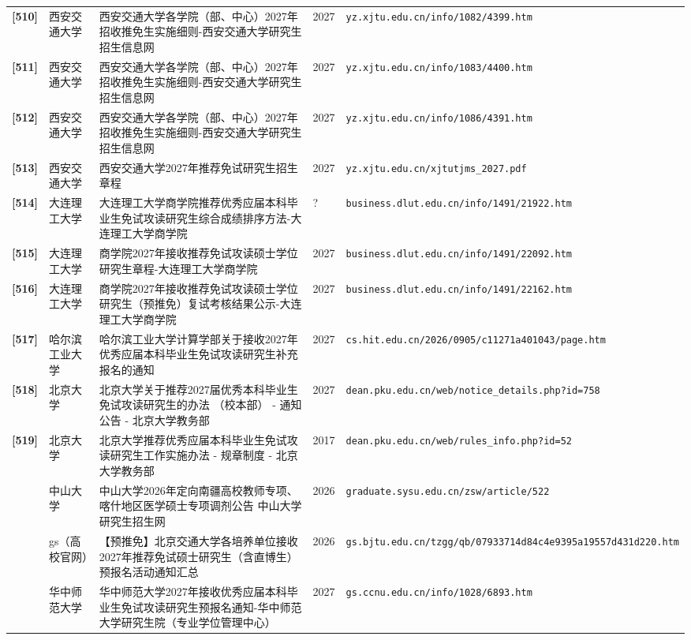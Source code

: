 {\begin{longtable}{@{}p{1.15cm}p{2.9cm}p{6.3cm}p{0.85cm}p{5.0cm}@{}}
\textbf{[510]} & 西安交通大学 & 西安交通大学各学院（部、中心）2027年招收推免生实施细则-西安交通大学研究生招生信息网 & 2027 & \texttt{yz.xjtu.edu.cn/info/1082/4399.htm} \\
\textbf{[511]} & 西安交通大学 & 西安交通大学各学院（部、中心）2027年招收推免生实施细则-西安交通大学研究生招生信息网 & 2027 & \texttt{yz.xjtu.edu.cn/info/1083/4400.htm} \\
\textbf{[512]} & 西安交通大学 & 西安交通大学各学院（部、中心）2027年招收推免生实施细则-西安交通大学研究生招生信息网 & 2027 & \texttt{yz.xjtu.edu.cn/info/1086/4391.htm} \\
\textbf{[513]} & 西安交通大学 & 西安交通大学2027年推荐免试研究生招生章程 & 2027 & \texttt{yz.xjtu.edu.cn/xjtutjms\_2027.pdf} \\
\textbf{[514]} & 大连理工大学 & 大连理工大学商学院推荐优秀应届本科毕业生免试攻读研究生综合成绩排序方法-大连理工大学商学院 & ? & \texttt{business.dlut.edu.cn/info/1491/21922.htm} \\
\textbf{[515]} & 大连理工大学 & 商学院2027年接收推荐免试攻读硕士学位研究生章程-大连理工大学商学院 & 2027 & \texttt{business.dlut.edu.cn/info/1491/22092.htm} \\
\textbf{[516]} & 大连理工大学 & 商学院2027年接收推荐免试攻读硕士学位研究生（预推免）复试考核结果公示-大连理工大学商学院 & 2027 & \texttt{business.dlut.edu.cn/info/1491/22162.htm} \\
\textbf{[517]} & 哈尔滨工业大学 & 哈尔滨工业大学计算学部关于接收2027年优秀应届本科毕业生免试攻读研究生补充报名的通知 & 2027 & \texttt{cs.hit.edu.cn/2026/0905/c11271a401043/page.htm} \\
\textbf{[518]} & 北京大学 & 北京大学关于推荐2027届优秀本科毕业生免试攻读研究生的办法 （校本部） - 通知公告 - 北京大学教务部 & 2027 & \texttt{dean.pku.edu.cn/web/notice\_details.php?id=758} \\
\textbf{[519]} & 北京大学 & 北京大学推荐优秀应届本科毕业生免试攻读研究生工作实施办法 - 规章制度 - 北京大学教务部 & 2017 & \texttt{dean.pku.edu.cn/web/rules\_info.php?id=52} \\
[0] & 中山大学 & 中山大学2026年定向南疆高校教师专项、喀什地区医学硕士专项调剂公告 \textbar{} 中山大学研究生招生网 & 2026 & \texttt{graduate.sysu.edu.cn/zsw/article/522} \\
[0] & gs（高校官网） & 【预推免】北京交通大学各培养单位接收2027年推荐免试硕士研究生（含直博生）预报名活动通知汇总 & 2026 & \texttt{gs.bjtu.edu.cn/tzgg/qb/07933714d84c4e9395a19557d431d220.htm} \\
[0] & 华中师范大学 & 华中师范大学2027年接收优秀应届本科毕业生免试攻读研究生预报名通知-华中师范大学研究生院（专业学位管理中心） & 2027 & \texttt{gs.ccnu.edu.cn/info/1028/6893.htm} \\

\end{longtable}}
